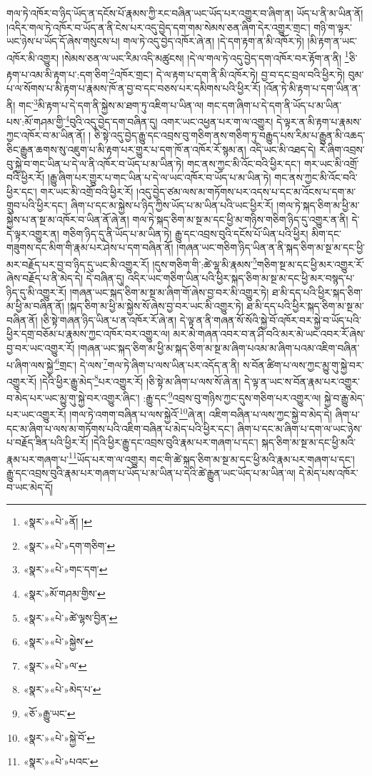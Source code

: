 གལ་ཏེ་འཁོར་བ་ཉིད་ཡོད་ན་དངོས་པོ་རྣམས་ཀྱི་རང་བཞིན་ཡང་ཡོད་པར་འགྱུར་བ་ཞིག་ན། ཡོད་པ་ནི་མ་ཡིན་ནོ། །འདིར་གལ་ཏེ་འཁོར་བ་ཡོད་ན་ནི་ངེས་པར་འདུ་བྱེད་དག་གམ་སེམས་ཅན་ཞིག་དེར་འགྱུར་གྲང་། གཉི་ག་ལྟར་ཡང་ཉེས་པ་ཡོད་དོ་ཞེས་གསུངས་པ། གལ་ཏེ་འདུ་བྱེད་འཁོར་ཞེ་ན། །དེ་དག་རྟག་ན་མི་འཁོར་ཏེ། །མི་རྟག་ན་ཡང་འཁོར་མི་འགྱུར། །སེམས་ཅན་ལ་ཡང་རིམ་འདི་མཚུངས། །དེ་ལ་གལ་ཏེ་འདུ་བྱེད་དག་འཁོར་བར་རྟོག་ན་ནི། \footnote{«སྣར་»«པེ་»ནོ། ། }ཅི་རྟག་པ་འམ་མི་རྟག་པ་:དག་ཅིག་\footnote{«སྣར་»«པེ་»དག་གཅིག་}འཁོར་གྲང་། དེ་ལ་རྟག་པ་དག་ནི་མི་འཁོར་ཏེ། བྱ་བ་དང་བྲལ་བའི་ཕྱིར་ཏེ། བུམ་པ་ལ་སོགས་པ་མི་རྟག་པ་རྣམས་ཁོ་ན་བྱ་བ་དང་བཅས་པར་དམིགས་པའི་ཕྱིར་རོ། །འོན་ཏེ་མི་རྟག་པ་དག་ཡིན་ན་ནི། གང་\footnote{«སྣར་»«པེ་»གང་དག་}མི་རྟག་པ་དེ་དག་ནི་སྐྱེས་མ་ཐག་ཏུ་འཇིག་པ་ཡིན་ལ། གང་དག་ཞིག་པ་དེ་དག་ནི་ཡོད་པ་མ་ཡིན་པས་:མོ་གཤམ་གྱི་\footnote{«སྣར་»མོ་གཤམ་གྱིས་}བུའི་འདུ་བྱེད་དག་བཞིན་དུ། འགར་ཡང་འཕྱན་པར་ག་ལ་འགྱུར། དེ་ལྟར་ན་མི་རྟག་པ་རྣམས་ཀྱང་འཁོར་བ་མ་ཡིན་ནོ། །
ཅི་སྟེ་འདུ་བྱེད་རྒྱུ་དང་འབྲས་བུ་གཅིག་ནས་གཅིག་ཏུ་བརྒྱུད་པས་རིམ་པ་རྒྱུན་མི་འཆད་ཅིང་རྒྱུན་ཆགས་སུ་འཇུག་པ་མི་རྟག་པར་གྱུར་པ་དག་ཁོ་ན་འཁོར་རོ་སྙམ་ན། འདི་ཡང་མི་འཐད་དེ། རེ་ཞིག་འབྲས་བུ་སྐྱེ་བ་གང་ཡིན་པ་དེ་ལ་ནི་འཁོར་བ་ཡོད་པ་མ་ཡིན་ཏེ། གང་ནས་ཀྱང་མི་འོང་བའི་ཕྱིར་དང་། གར་ཡང་མི་འགྲོ་བའི་ཕྱིར་རོ། །རྒྱུ་ཞིག་པར་གྱུར་པ་གང་ཡིན་པ་དེ་ལ་ཡང་འཁོར་བ་ཡོད་པ་མ་ཡིན་ཏེ། གང་ནས་ཀྱང་མི་འོང་བའི་ཕྱིར་དང་། གར་ཡང་མི་འགྲོ་བའི་ཕྱིར་རོ། །འདུ་བྱེད་ཙམ་ལས་མ་གཏོགས་པར་འདས་པ་དང་མ་འོངས་པ་དག་མ་གྲུབ་པའི་ཕྱིར་དང་། ཞིག་པ་དང་མ་སྐྱེས་པ་ཉིད་ཀྱིས་ཡོད་པ་མ་ཡིན་པའི་ཡང་ཕྱིར་རོ། །གལ་ཏེ་སྐད་ཅིག་མ་ཕྱི་མ་སྐྱེས་པ་ན་སྔ་མ་འཁོར་བ་ཡིན་ནོ་ཞེ་ན། གལ་ཏེ་སྐད་ཅིག་མ་སྔ་མ་དང་ཕྱི་མ་གཉིས་གཅིག་ཉིད་དུ་འགྱུར་ན་ནི། དེ་དེ་ལྟར་འགྱུར་ན། གཅིག་ཉིད་དུ་ནི་ཡོད་པ་མ་ཡིན་ཏེ། རྒྱུ་དང་འབྲས་བུའི་དངོས་པོ་ཡིན་པའི་ཕྱིར། མིག་དང་གཟུགས་དང་མིག་གི་རྣམ་པར་ཤེས་པ་དག་བཞིན་ནོ། །གཞན་ཡང་གཅིག་ཉིད་ཡིན་ན་ནི་སྐད་ཅིག་མ་སྔ་མ་དང་ཕྱི་མར་བརྗོད་པར་བྱ་བ་ཉིད་དུ་ཡང་མི་འགྱུར་རོ། །དུས་གཅིག་གི་:ཚེ་ལྷ་མི་རྣམས་\footnote{«སྣར་»«པེ་»ཚེ་ལྷས་བྱིན་}གཅིག་སྔ་མ་དང་ཕྱི་མར་འགྱུར་རོ་ཞེས་བརྗོད་པ་ནི་མེད་དེ། དེ་བཞིན་དུ། འདིར་ཡང་གཅིག་ཡིན་པའི་ཕྱིར་སྐད་ཅིག་མ་སྔ་མ་དང་ཕྱི་མར་བསྙད་པ་ཉིད་དུ་མི་འགྱུར་རོ། །གཞན་ཡང་སྐད་ཅིག་མ་སྔ་མ་ཞིག་གོ་ཞེས་བྱ་བར་མི་འགྱུར་ཏེ། ཐ་མི་དད་པའི་ཕྱིར་སྐད་ཅིག་མ་ཕྱི་མ་བཞིན་ནོ། །སྐད་ཅིག་མ་ཕྱི་མ་སྐྱེས་སོ་ཞེས་བྱ་བར་ཡང་མི་འགྱུར་ཏེ། ཐ་མི་དད་པའི་ཕྱིར་སྐད་ཅིག་མ་སྔ་མ་བཞིན་ནོ། །ཅི་སྟེ་གཞན་ཉིད་ཡིན་པ་ན་འཁོར་རོ་ཞེ་ན། དེ་ལྟ་ན་ནི་གཞན་སོ་སོའི་སྐྱེ་བོ་འཁོར་བར་སྐྱེ་བ་ཡོད་པའི་ཕྱིར་དགྲ་བཅོམ་པ་རྣམས་ཀྱང་འཁོར་བར་འགྱུར་ལ། མར་མེ་གཞན་འབར་བ་ན་ཤི་བའི་མར་མེ་ཡང་འབར་རོ་ཞེས་བྱ་བར་ཡང་འགྱུར་རོ། །གཞན་ཡང་སྐད་ཅིག་མ་ཕྱི་མ་སྐད་ཅིག་མ་སྔ་མ་ཞིག་པའམ་མ་ཞིག་པའམ་འཇིག་བཞིན་པ་ཞིག་ལས་སྐྱེ་\footnote{«སྣར་»«པེ་»སྐྱེས་}གྲང་། དེ་ལས་\footnote{«སྣར་»«པེ་»ལ་}གལ་ཏེ་ཞིག་པ་ལས་ཡིན་པར་འདོད་ན་ནི། ས་བོན་ཚིག་པ་ལས་ཀྱང་མྱུ་གུ་སྐྱེ་བར་འགྱུར་རོ། །དེའི་ཕྱིར་རྒྱུ་མེད་\footnote{«སྣར་»«པེ་»མེད་པ་}པར་འགྱུར་རོ། །ཅི་སྟེ་མ་ཞིག་པ་ལས་སོ་ཞེ་ན། དེ་ལྟ་ན་ཡང་ས་བོན་རྣམ་པར་འགྱུར་བ་མེད་པར་ཡང་མྱུ་གུ་སྐྱེ་བར་འགྱུར་ཞིང་། :རྒྱུ་དང་\footnote{«ཅོ་»རྒྱུ་ཡང་}འབྲས་བུ་གཉིས་ཀྱང་དུས་གཅིག་པར་འགྱུར་ལ། སྐྱེ་བ་རྒྱུ་མེད་པར་ཡང་འགྱུར་རོ། །གལ་ཏེ་འགག་བཞིན་པ་ལས་སྐྱེའོ་\footnote{«སྣར་»«པེ་»སྐྱེ་བོ་}ཞེ་ན། འཇིག་བཞིན་པ་ལས་ཀྱང་སྐྱེ་བ་མེད་དེ། ཞིག་པ་དང་མ་ཞིག་པ་ལས་མ་གཏོགས་པའི་འཇིག་བཞིན་པ་མེད་པའི་ཕྱིར་དང་། ཞིག་པ་དང་མ་ཞིག་པ་དག་ལ་ཡང་ཉེས་པ་བརྗོད་ཟིན་པའི་ཕྱིར་རོ། །དེའི་ཕྱིར་རྒྱུ་དང་འབྲས་བུའི་རྣམ་པར་གཞག་པ་དང་། སྐད་ཅིག་མ་སྔ་མ་དང་ཕྱི་མའི་རྣམ་པར་གཞག་པ་\footnote{«སྣར་»«པེ་»པའང་}ཡོད་པར་ག་ལ་འགྱུར། གང་གི་ཚེ་སྐད་ཅིག་མ་སྔ་མ་དང་ཕྱི་མའི་རྣམ་པར་གཞག་པ་དང་། རྒྱུ་དང་འབྲས་བུའི་རྣམ་པར་གཞག་པ་ཡོད་པ་མ་ཡིན་པ་དེའི་ཚེ་རྒྱུན་ཡང་ཡོད་པ་མ་ཡིན་ལ། དེ་མེད་པས་འཁོར་བ་ཡང་མེད་དོ། 
